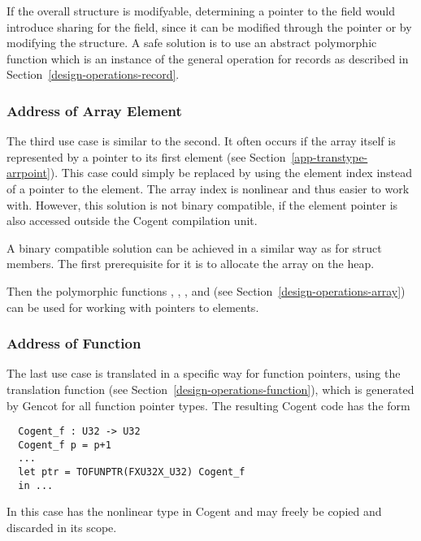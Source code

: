 If the overall structure is modifyable, determining a pointer to the field would introduce sharing for the
field, since it can be modified through the pointer or by modifying the structure. A safe solution is to use 
an abstract polymorphic function  which is an instance of the general  operation
for records as described in Section~\ref{design-operations-record}.

\subsubsection{Address of Array Element}

The third use case is similar to the second. It often occurs if the array itself is represented by a pointer to its first
element (see Section~\ref{app-transtype-arrpoint}). This case could simply be replaced by using the element index instead of a 
pointer to the element. The array index is nonlinear and thus easier to work with. However, this solution is not binary
compatible, if the element pointer is also accessed outside the Cogent compilation unit.

A binary compatible solution can be achieved in a similar way as for struct members. The first prerequisite for it is
to allocate the array on the heap.

Then the polymorphic functions , , , and 
(see Section~\ref{design-operations-array}) can be used for working with pointers to elements.

\subsubsection{Address of Function}

The last use case is translated in a specific way for function pointers, using the translation function
 (see Section~\ref{design-operations-function}), which is generated by Gencot for all function
pointer types. The resulting Cogent code has the form
\begin{verbatim}
  Cogent_f : U32 -> U32
  Cogent_f p = p+1
  ...
  let ptr = TOFUNPTR(FXU32X_U32) Cogent_f
  in ...
\end{verbatim}
In this case  has the nonlinear type  in Cogent and may freely be copied and
discarded in its scope.

